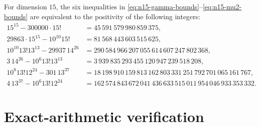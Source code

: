 \documentclass[11pt,a4paper]{article}
\numberwithin{equation}{section}
\theoremstyle{definition}
\newcommand{\1}{\mathbf{1}}
\begin{document}
For dimension $15$, the six inequalities in \eqref{eq:n15-gamma-bounds}--\eqref{eq:n15-mu2-bounds} are equivalent to the positivity of the following integers:
\begin{equation}\label{eq:n15-integers}
\begin{aligned}
15^{15}-300000\cdot15!
 &=45\,591\,579\,980\,859\,375,\\
29863\cdot15^{15}-10^{10}15!
 &=81\,568\,443\,603\,515\,625,\\
10^{10}13!13^{13}-29937\,14^{26}
 &=290\,584\,966\,207\,055\,614\,607\,247\,802\,368,\\
3\,14^{26}-10^6 13!13^{13}
 &=3\,939\,835\,293\,455\,120\,947\,239\,518\,208,\\
10^8 13!12^{24}-301\,13^{37}
 &=18\,198\,910\,159\,813\,162\,803\,331\,251\,792\,701\,065\,161\,767,\\
4\,13^{37}-10^6 13!12^{24}
 &=162\,574\,843\,672\,041\,436\,633\,515\,011\,954\,046\,933\,353\,332.
\end{aligned}
\end{equation}

\section{Exact-arithmetic verification}\label{app:code}
\end{document}
